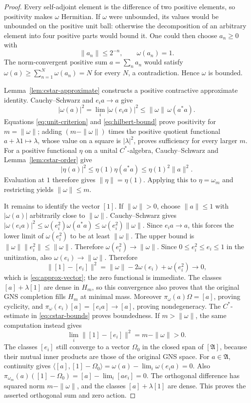 \documentclass[11pt]{article}
\theoremstyle{definition}
\theoremstyle{remark}
\numberwithin{equation}{section}
\begin{document}
\begin{proof}
Every self-adjoint element is the difference of two positive elements,
so positivity makes $\omega$ Hermitian.  If $\omega$ were unbounded, its
values would be unbounded on the positive unit ball: otherwise the
decomposition of an arbitrary element into four positive parts would
bound it.  One could then choose $a_n\geq0$ with
\[
 \|a_n\|\leq2^{-n},\qquad \omega(a_n)=1.
\]
The norm-convergent positive sum $a=\sum_na_n$ would satisfy
$\omega(a)\geq\sum_{n=1}^N\omega(a_n)=N$ for every $N$, a
contradiction.  Hence $\omega$ is bounded.

Lemma~\ref{lem:cstar-approximate} constructs a positive contractive
approximate identity.  Cauchy--Schwarz and
$e_i a\to a$ give
\begin{equation}
 |\omega(a)|^2
 =\lim_i|\omega(e_i a)|^2
 \leq\|\omega\|\,\omega(a^*a).
 \label{eq:hilbert-bound}
\end{equation}
Equations \eqref{eq:unit-criterion} and \eqref{eq:hilbert-bound} prove
positivity for $m=\|\omega\|$; adding $(m-\|\omega\|)$ times the
positive quotient functional $a+\lambda1\mapsto\lambda$, whose value
on a square is $|\lambda|^2$, proves
sufficiency for every larger $m$.  For a positive functional $\eta$ on a
unital $C^*$-algebra, Cauchy--Schwarz and Lemma~\ref{lem:cstar-order} give
\[
 |\eta(a)|^2\leq\eta(1)\eta(a^*a)
             \leq\eta(1)^2\|a\|^2.
\]
Evaluation at $1$ therefore gives $\|\eta\|=\eta(1)$.
Applying this to $\eta=\omega_m$ and restricting yields $\|\omega\|\leq m$.

It remains to identify the vector $[1]$.  If $\|\omega\|>0$, choose
$\|a\|\leq1$ with $|\omega(a)|$ arbitrarily close to $\|\omega\|$.
Cauchy--Schwarz gives
$|\omega(e_i a)|^2\leq\omega(e_i^2)\omega(a^*a)
\leq\omega(e_i^2)\|\omega\|$.
Since $e_i a\to a$, this forces the lower limit of $\omega(e_i^2)$ to be
at least $\|\omega\|$.  The upper bound is $\|\omega\|\|e_i^2\|\leq\|\omega\|$.
Therefore $\omega(e_i^2)\to\|\omega\|$.
Since $0\leq e_i^2\leq e_i\leq1$ in the unitization, also
$\omega(e_i)\to\|\omega\|$.  Therefore
\[
 \|[1]-[e_i]\|^2
 =\|\omega\|-2\omega(e_i)+\omega(e_i^2)\longrightarrow0,
\]
which is \eqref{eq:approx-vector}; the zero functional is immediate.
The classes $[a]+\lambda[1]$ are dense in $H_m$, so this convergence
also proves that the original GNS completion fills $H_m$ at minimal mass.
Moreover $\pi_\omega(a)\Omega=[a]$, proving cyclicity, and
$\pi_\omega(e_i)[a]=[e_i a]\to[a]$, proving nondegeneracy.  The
$C^*$-estimate in \eqref{eq:cstar-bounds} proves boundedness.  If
$m>\|\omega\|$, the same computation instead gives
\[
 \lim_i\|[1]-[e_i]\|^2=m-\|\omega\|>0.
\]
The classes $[e_i]$ still converge to a vector $\Omega_0$ in the closed
span of $[\mathfrak A]$, because their mutual inner products are those
of the original GNS space.  For $a\in\mathfrak A$, continuity gives
$\langle[a],[1]-\Omega_0\rangle
=\omega(a)-\lim_i\omega(e_i a)=0$.
Also $\pi_{\omega_m}(a)([1]-\Omega_0)
=[a]-\lim_i[ae_i]=0$.
The orthogonal difference has squared norm $m-\|\omega\|$, and the
classes $[a]+\lambda[1]$ are dense.  This proves the asserted orthogonal
sum and zero action.
\end{proof}
\end{document}
